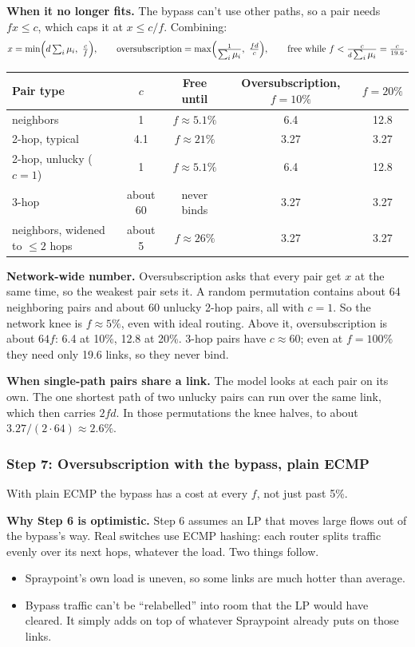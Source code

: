 \textbf{When it no longer fits.} The bypass can't use other paths, so a pair needs $f x \le c$, which caps it at $x \le c/f$. Combining:
\[
x = \min\!\Big( d \sumu,\ \frac{c}{f} \Big),
\qquad
\text{oversubscription} = \max\!\Big( \frac{1}{\sumu},\ \frac{f d}{c} \Big),
\qquad
\text{free while } f < \frac{c}{d \sumu} = \frac{c}{19.6}.
\]

\begin{center}
\begin{tabular}{@{}lcccc@{}}
\toprule
Pair type & $c$ & Free until & Oversubscription, $f = 10\%$ & $f = 20\%$ \\
\midrule
neighbors & 1 & $f \approx 5.1\%$ & 6.4 & 12.8 \\
2-hop, typical & 4.1 & $f \approx 21\%$ & 3.27 & 3.27 \\
2-hop, unlucky ($c = 1$) & 1 & $f \approx 5.1\%$ & 6.4 & 12.8 \\
3-hop & about 60 & never binds & 3.27 & 3.27 \\
neighbors, widened to $\le 2$ hops & about 5 & $f \approx 26\%$ & 3.27 & 3.27 \\
\bottomrule
\end{tabular}
\end{center}

\textbf{Network-wide number.} Oversubscription asks that every pair get $x$ at the same time, so the weakest pair sets it. A random permutation contains about 64 neighboring pairs and about 60 unlucky 2-hop pairs, all with $c = 1$. So the network knee is $f \approx 5\%$, even with ideal routing. Above it, oversubscription is about $64 f$: 6.4 at 10\%, 12.8 at 20\%. 3-hop pairs have $c \approx 60$; even at $f = 100\%$ they need only 19.6 links, so they never bind.

\textbf{When single-path pairs share a link.} The model looks at each pair on its own. The one shortest path of two unlucky pairs can run over the same link, which then carries $2 f d$. In those permutations the knee halves, to about $3.27 / (2 \cdot 64) \approx 2.6\%$.

\subsubsection{Step 7: Oversubscription with the bypass, plain ECMP}

With plain ECMP the bypass has a cost at every $f$, not just past 5\%.

\textbf{Why Step 6 is optimistic.} Step 6 assumes an LP that moves large flows out of the bypass's way. Real switches use ECMP hashing: each router splits traffic evenly over its next hops, whatever the load. Two things follow.
\begin{itemize}
  \item Spraypoint's own load is uneven, so some links are much hotter than average.
  \item Bypass traffic can't be ``relabelled'' into room that the LP would have cleared. It simply adds on top of whatever Spraypoint already puts on those links.
\end{itemize}

